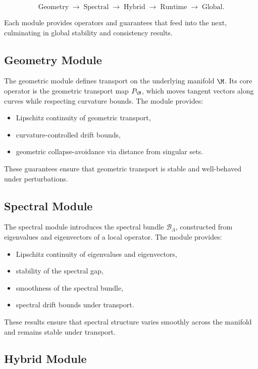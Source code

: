 \documentclass[11pt]{article}
\begin{document}
\[
\text{Geometry} \;\longrightarrow\; 
\text{Spectral} \;\longrightarrow\;
\text{Hybrid} \;\longrightarrow\;
\text{Runtime} \;\longrightarrow\;
\text{Global}.
\]

Each module provides operators and guarantees that feed into the next,
culminating in global stability and consistency results.

\subsection{Geometry Module}

The geometric module defines transport on the underlying manifold $\M$.
Its core operator is the geometric transport map $P_\M$, which moves
tangent vectors along curves while respecting curvature bounds. The
module provides:

\begin{itemize}
    \item Lipschitz continuity of geometric transport,
    \item curvature-controlled drift bounds,
    \item geometric collapse-avoidance via distance from singular sets.
\end{itemize}

These guarantees ensure that geometric transport is stable and
well-behaved under perturbations.

\subsection{Spectral Module}

The spectral module introduces the spectral bundle $\mathcal{B}_\Lambda$,
constructed from eigenvalues and eigenvectors of a local operator. The
module provides:

\begin{itemize}
    \item Lipschitz continuity of eigenvalues and eigenvectors,
    \item stability of the spectral gap,
    \item smoothness of the spectral bundle,
    \item spectral drift bounds under transport.
\end{itemize}

These results ensure that spectral structure varies smoothly across the
manifold and remains stable under transport.

\subsection{Hybrid Module}
\end{document}
